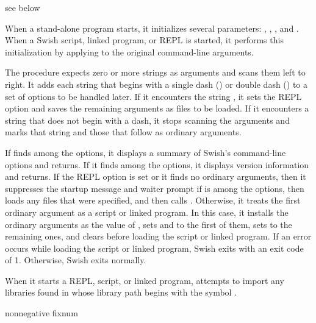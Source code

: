\begin{procedure}
\end{procedure}
\returns{} see below

When a stand-alone program starts, it initializes several parameters:
, , , and
.
When a Swish script, linked program, or REPL is started, it performs this
initialization by applying  to the original command-line
arguments.

The  procedure expects zero or more strings as arguments
and scans them left to right.
It adds each string that begins with a single dash (\sopt{}) or double dash
(\lopt{}) to a set of options to be handled later.
If it encounters the string \str{\lopt{}}, it sets the REPL option and
saves the remaining arguments as files to be loaded.
If it encounters a string that does not begin with a dash, it stops scanning
the arguments and marks that string and those that follow as ordinary
arguments.

If  finds  among the options,
it displays a summary of Swish's command-line options and returns.
If it finds  among the options,
it displays version information and returns.
If the REPL option is set or it finds no ordinary arguments, then it
suppresses the startup message and waiter prompt 
if  is among the options,
then loads any files that were specified,
and then calls . 
Otherwise, it treats the first ordinary argument as a script or linked program.
In this case, it installs the ordinary arguments as
the value of ,
sets  and  to the first of them,
sets  to the remaining ones,
and clears 
before loading the script or linked program.
If an error occurs while loading the script or linked program,
Swish exits with an exit code of 1.
Otherwise, Swish exits normally.

When it starts a REPL, script, or linked program,  attempts
to import any libraries found in  whose library path begins
with the symbol .

\begin{parameter}
\end{parameter}
\hasvalue{} nonnegative fixnum

